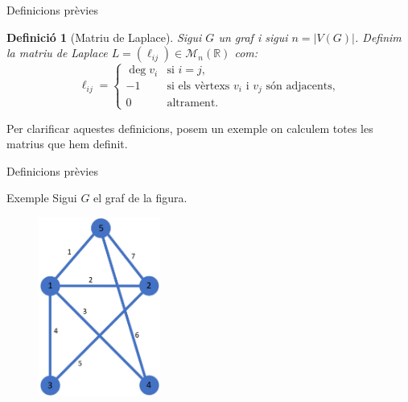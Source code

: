 \documentclass{beamer}
\newtheorem{defin}[theorem]{Definició}
\begin{document}
\begin{frame}{Definicions prèvies}
    \begin{defin}[Matriu de Laplace]
        \normalfont Sigui $G$ un graf i sigui $n=|V(G)|$. Definim la matriu de Laplace $L=(\ell_{ij})\in\mathcal{M}_n(\mathbb{R})$ com:
        $$\ell_{ij}=\left\{\begin{array}{cl}
            \deg v_i & \text{si $i=j$,}\\
            -1 & \text{si els vèrtexs $v_i$ i $v_j$ són adjacents,}\\
            0 & \text{altrament.}
        \end{array}\right.$$
    \end{defin}\pause
    Per clarificar aquestes definicions, posem un exemple on calculem totes les matrius que hem definit.
\end{frame}
\begin{frame}{Definicions prèvies}
    \begin{exampleblock}{Exemple}
      Sigui $G$ el graf de la figura.
      \begin{figure}
          \centering
          \includegraphics[width=4cm]{imatges/exemple1.jpg}
      \end{figure}
    \end{exampleblock}
\end{frame}
\end{document}
